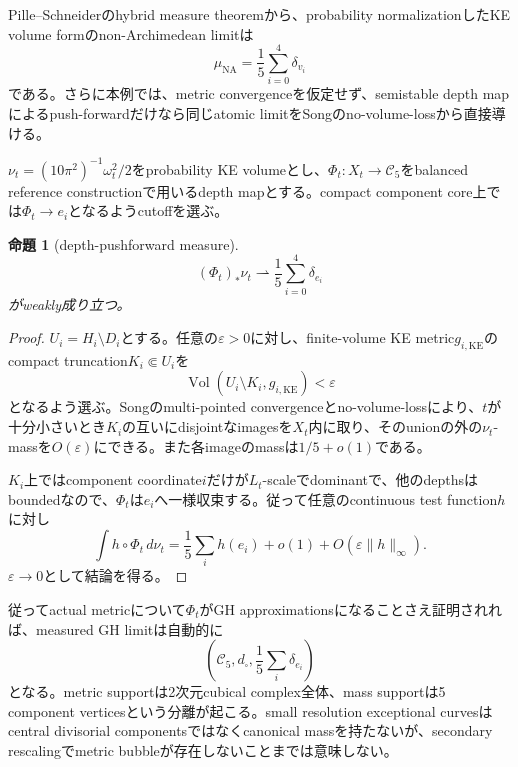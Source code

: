 \documentclass[11pt,a4paper]{ltjsarticle}
\newtheorem{proposition}[theorem]{命題}
\theoremstyle{definition}
\theoremstyle{remark}
\newcommand{\cC}{\mathcal C}
\newcommand{\Vol}{\operatorname{Vol}}
\begin{document}
Pille--Schneiderのhybrid measure theorem\cite{PilleSchneider}から、probability normalizationしたKE volume formのnon-Archimedean limitは
\begin{equation}\label{eq:atomicmeasure}
 \mu_{\mathrm{NA}}=\frac15\sum_{i=0}^4\delta_{v_i}
\end{equation}
である。さらに本例では、metric convergenceを仮定せず、semistable depth mapによるpush-forwardだけなら同じatomic limitをSongのno-volume-lossから直接導ける。

$\nu_t=(10\pi^2)^{-1}\omega_t^2/2$をprobability KE volumeとし、$\Phi_t:X_t\to\cC_5$をbalanced reference constructionで用いるdepth mapとする。compact component core上では$\Phi_t\to e_i$となるようcutoffを選ぶ。

\begin{proposition}[depth-pushforward measure]\label{prop:depth-pushforward-measure}
\begin{equation}\label{eq:depth-measure-limit}
 (\Phi_t)_*\nu_t\rightharpoonup
 \frac15\sum_{i=0}^4\delta_{e_i}
\end{equation}
がweakly成り立つ。
\end{proposition}

\begin{proof}
$U_i=H_i\setminus D_i$とする。任意の$\varepsilon>0$に対し、finite-volume KE metric$g_{i,\mathrm{KE}}$のcompact truncation$K_i\Subset U_i$を
\[
 \Vol(U_i\setminus K_i,g_{i,\mathrm{KE}})<\varepsilon
\]
となるよう選ぶ。Songのmulti-pointed convergenceとno-volume-loss\cite{Song}により、$t$が十分小さいとき$K_i$の互いにdisjointなimagesを$X_t$内に取り、そのunionの外の$\nu_t$-massを$O(\varepsilon)$にできる。また各imageのmassは$1/5+o(1)$である。

$K_i$上ではcomponent coordinate$i$だけが$L_t$-scaleでdominantで、他のdepthsはboundedなので、$\Phi_t$は$e_i$へ一様収束する。従って任意のcontinuous test function$h$に対し
\[
 \int h\circ\Phi_t\,d\nu_t
 =\frac15\sum_i h(e_i)+o(1)+O(\varepsilon\|h\|_\infty).
\]
$\varepsilon\to0$として結論を得る。
\end{proof}

従ってactual metricについて$\Phi_t$がGH approximationsになることさえ証明されれば、measured GH limitは自動的に
\[
 \left(\mathcal C_5,d_\square,\frac15\sum_i\delta_{e_i}\right)
\]
となる。metric supportは2次元cubical complex全体、mass supportは5 component verticesという分離が起こる。small resolution exceptional curvesはcentral divisorial componentsではなくcanonical massを持たないが、secondary rescalingでmetric bubbleが存在しないことまでは意味しない。
\end{document}
